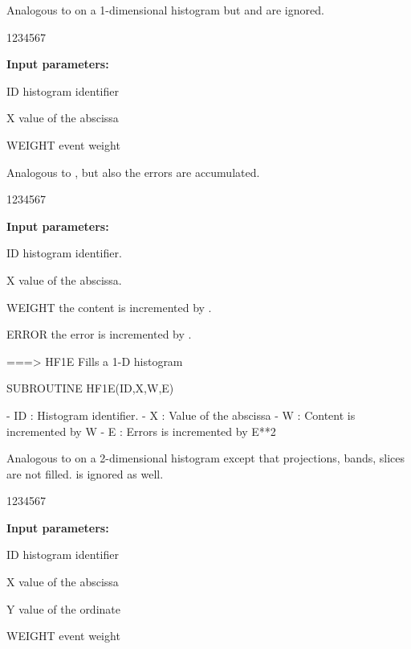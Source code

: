  
\Action Analogous to  on a 1-dimensional histogram
but  and  are ignored.
 
\begin{DLttc}{1234567}
\item[{\rm\bf Input parameters:}]
\item[ID] histogram identifier
\item[X] value of the abscissa
\item[WEIGHT] event weight
\end{DLttc}
 
 
\Action Analogous to , but also the errors are accumulated.
 
\begin{DLttc}{1234567}
\item[{\rm\bf Input parameters:}]
\item[ID] histogram identifier.
\item[X] value of the abscissa.
\item[WEIGHT] the content is incremented by .
\item[ERROR] the error is incremented by .
\end{DLttc}
 

===>  HF1E Fills a 1-D histogram

      SUBROUTINE HF1E(ID,X,W,E)

      - ID : Histogram identifier.
      - X  : Value of the abscissa
      - W  : Content is incremented by W
      - E  : Errors is incremented by E**2


 
\Action 
Analogous to 
on a 2-dimensional histogram except that projections,
bands, slices are not filled. 
 is ignored as well.
 
\begin{DLttc}{1234567}
\item[{\rm\bf Input parameters:}]
\item[ID] histogram identifier
\item[X] value of the abscissa
\item[Y] value of the ordinate
\item[WEIGHT] event weight
\end{DLttc}
 
 
